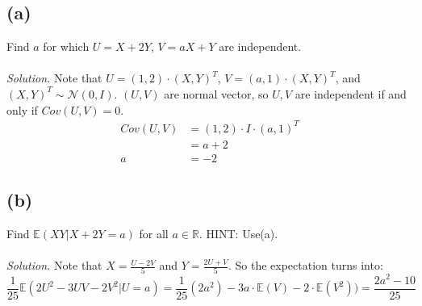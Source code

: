 \documentclass{article}
\begin{document}
\subsection*{(a)}
Find $a$ for which $U=X+2Y$, $V=aX+Y$ are independent.
\color{blue}
\\\\
\textit{Solution. }Note that $U = (1,2)\cdot(X,Y)^T$, $V = (a,1)\cdot(X,Y)^T$, and $(X,Y)^T \sim \mathcal{N}(0,I)$. $(U,V)$ are normal vector, so $U,V$ are independent if and only if $Cov(U,V)=0$.  
\begin{equation*}
    \begin{split}
        Cov(U,V) &= (1,2)\cdot I \cdot (a,1)^T\\
            &=a+2\\
        a &= -2
    \end{split}
\end{equation*}
\color{black}
\subsection*{(b)}
Find $\mathbb{E}(XY|X+2Y=a)$ for all $a\in\mathbb{R}$. HINT: Use(a).
\color{blue}
\\\\
\textit{Solution. }Note that $X = \frac{U-2V}{5}$ and $Y = \frac{2U+V}{5}$. So the expectation turns into:
\begin{equation*}
    \frac{1}{25}\mathbb{E}(2U^2-3UV-2V^2|U=a) = \frac{1}{25}(2a^2)-3a\cdot\mathbb{E}(V)-2\cdot\mathbb{E}(V^2)) = \frac{2a^2-10}{25}
\end{equation*}
\end{document}
